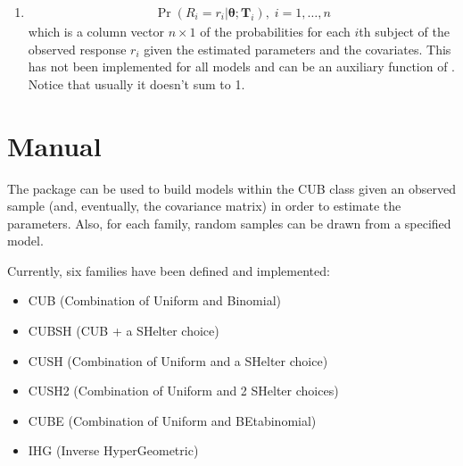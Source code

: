 \documentclass[letterpaper,10pt,english]{sphinxmanual}
\begin{document}
\begin{enumerate}
\item {} \begin{description}
\begin{equation*}
\begin{split}\Pr(R_i=r_i|\pmb\theta;\pmb T_i),\; i=1,\ldots,n\end{split}
\end{equation*}
\sphinxAtStartPar
which is a column vector \(n \times 1\) of the probabilities for each \(i\)\sphinxhyphen{}th subject
of the observed response \(r_i\) given the estimated parameters and the covariates.
This has not been implemented for all models and can be an auxiliary function
of . Notice that usually it doesn’t sum to 1.

\end{description}

\end{enumerate}

\begin{DUlineblock}{0em}
\item[] 
\item[] 
\item[] 
\end{DUlineblock}

\sphinxstepscope


\chapter{Manual}
\label{\detokenize{manual:manual}}\label{\detokenize{manual::doc}}
\sphinxAtStartPar
The package  can be used to build models within the CUB class
given an observed sample (and, eventually, the covariance matrix)
in order to estimate the parameters. Also, for each family,
random samples can be drawn from a specified model.

\sphinxAtStartPar
Currently, six families have been defined and implemented:
\begin{itemize}
\item {} 
\sphinxAtStartPar
CUB (Combination of Uniform and Binomial)

\item {} 
\sphinxAtStartPar
CUBSH (CUB + a SHelter choice)

\item {} 
\sphinxAtStartPar
CUSH (Combination of Uniform and a SHelter choice)

\item {} 
\sphinxAtStartPar
CUSH2 (Combination of Uniform and 2 SHelter choices)

\item {} 
\sphinxAtStartPar
CUBE (Combination of Uniform and BEta\sphinxhyphen{}binomial)

\item {} 
\sphinxAtStartPar
IHG (Inverse HyperGeometric)

\end{itemize}
\end{document}
